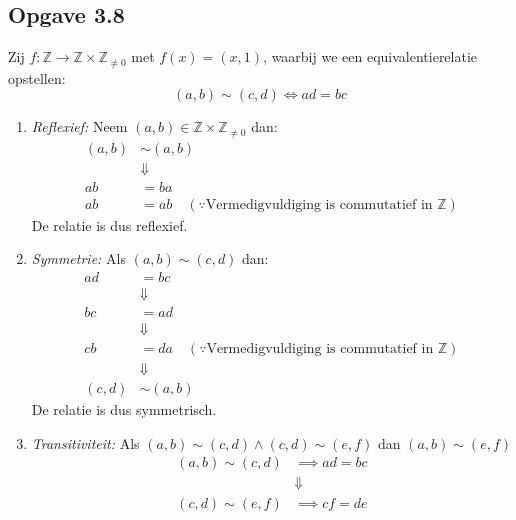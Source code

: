 \documentclass{article}
\newcommand{\Z}{\mathbb{Z}}
\newcommand{\tx}[1]{\text{#1}}
\begin{document}
\subsection*{Opgave 3.8}
Zij $f: \Z \rightarrow \Z \times \Z_{\neq 0}$ met $f(x) = (x, 1)$, waarbij we een equivalentierelatie opstellen:
\[(a, b) \sim (c, d) \Longleftrightarrow ad = bc\]
\begin{enumerate}[label=\arabic*]
	\item \emph{Reflexief:} Neem $(a, b) \in \Z \times \Z_{\neq 0}$ dan:
	      \begin{align*}
		      (a, b) & \sim (a,b)                                                         \\
		             & \Downarrow                                                         \\
		      ab     & = ba                                                               \\
		      ab     & = ab \quad (\because \tx{Vermedigvuldiging is commutatief in } \Z)
	      \end{align*}
	      De relatie is dus reflexief.
	\item \emph{Symmetrie:} Als $(a, b) \sim (c,d)$ dan:
	      \begin{align*}
		      ad     & = bc                                                               \\
		             & \Downarrow                                                         \\
		      bc     & = ad                                                               \\
		             & \Downarrow                                                         \\
		      cb     & = da \quad (\because \tx{Vermedigvuldiging is commutatief in } \Z) \\
		             & \Downarrow                                                         \\
		      (c,d ) & \sim (a,b)
	      \end{align*}
	      De relatie is dus symmetrisch.
	\item \emph{Transitiviteit:} Als $(a, b) \sim (c, d) \wedge (c, d) \sim (e, f)$ dan $(a, b) \sim (e, f)$
	      \begin{align*}
		      (a, b) \sim (c, d) & \implies ad = bc \\
		                         & \Downarrow       \\
		      (c, d) \sim (e, f) & \implies cf = de \\

\end{align*}
\end{enumerate}
\end{document}
